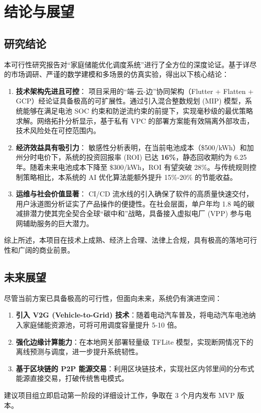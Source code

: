 \chapter{结论与展望}

\section{研究结论}

本可行性研究报告对“家庭储能优化调度系统”进行了全方位的深度论证。基于详尽的市场调研、严谨的数学建模和多场景的仿真实验，得出以下核心结论：

\begin{enumerate}
      \item \textbf{技术架构先进且可控}：
            项目采用的“端-云-边”协同架构（Flutter + Flatten + GCP）经论证具备极高的可扩展性。通过引入混合整数规划 (MIP) 模型，系统能够在满足电池 SOC 约束和防逆流约束的前提下，实现毫秒级的最优策略求解。网络拓扑分析显示，基于私有 VPC 的部署方案能有效隔离外部攻击，技术风险处在可控范围内。

      \item \textbf{经济效益具有吸引力}：
            敏感性分析表明，在当前电池成本（\$500/kWh）和加州分时电价下，系统的投资回报率 (ROI) 已达 \textbf{16\%}，静态回收期约为 6.25 年。随着未来电池成本下降至 \$300/kWh，ROI 有望突破 28\%。与传统规则控制策略相比，本系统的 AI 优化算法能额外提升 15\%-20\% 的节能收益。

      \item \textbf{运维与社会价值显著}：
            CI/CD 流水线的引入确保了软件的高质量快速交付，用户泳道图分析证实了产品操作的便捷性。在社会层面，单户年均 1.8 吨的碳减排潜力使其完全契合全球“碳中和”战略，具备接入虚拟电厂 (VPP) 参与电网辅助服务的巨大潜力。
\end{enumerate}

综上所述，本项目在技术上成熟、经济上合理、法律上合规，具有极高的落地可行性和广阔的商业前景。

\section{未来展望}

尽管当前方案已具备极高的可行性，但面向未来，系统仍有演进空间：
\begin{enumerate}
      \item \textbf{引入 V2G (Vehicle-to-Grid) 技术}：随着电动汽车普及，将电动汽车电池纳入家庭储能资源池，可将可用调度容量提升 5-10 倍。
      \item \textbf{强化边缘计算能力}：在本地网关部署轻量级 TFLite 模型，实现断网情况下的离线预测与调度，进一步提升系统韧性。
      \item \textbf{基于区块链的 P2P 能源交易}：利用区块链技术，实现社区内邻里间的分布式能源直接交易，打破传统售电模式。
\end{enumerate}

建议项目组立即启动第一阶段的详细设计工作，争取在 3 个月内发布 MVP 版本。
